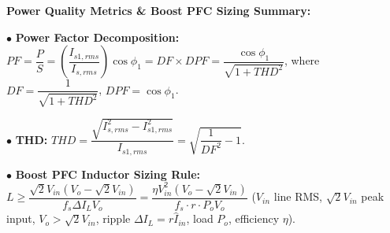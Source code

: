\vspace{-10pt}
\noindent\textbf{Power Quality Metrics \& Boost PFC Sizing Summary:} \par\vspace{1pt}
\noindent$\bullet$ \textbf{Power Factor Decomposition:} $PF = \dfrac{P}{S} = \left(\dfrac{I_{s1,rms}}{I_{s,rms}}\right) \cos\phi_1 = DF \times DPF = \dfrac{\cos\phi_1}{\sqrt{1 + THD^2}}$, where $DF = \dfrac{1}{\sqrt{1 + THD^2}}$, $DPF = \cos\phi_1$. \par\vspace{1pt}
\noindent$\bullet$ \textbf{THD:} $THD = \dfrac{\sqrt{I_{s,rms}^2 - I_{s1,rms}^2}}{I_{s1,rms}} = \sqrt{\dfrac{1}{DF^2} - 1}$. \par\vspace{1pt}
\noindent$\bullet$ \textbf{Boost PFC Inductor Sizing Rule:} $L \ge \dfrac{\sqrt{2}V_{in}(V_o - \sqrt{2}V_{in})}{f_s \Delta I_L V_o} = \dfrac{\eta V_{in}^2 (V_o - \sqrt{2}V_{in})}{f_s \cdot r \cdot P_o V_o}$ ($V_{in}$ line RMS, $\sqrt{2}V_{in}$ peak input, $V_o > \sqrt{2}V_{in}$, ripple $\Delta I_L = r \hat{I}_{in}$, load $P_o$, efficiency $\eta$).

\clearpage


